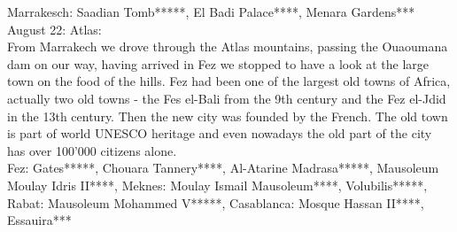 Marrakesch: Saadian Tomb*****, El Badi Palace****, Menara Gardens***\\

August 22: Atlas:\\
From Marrakech we drove through the Atlas mountains, passing the Ouaoumana dam on our way, having arrived in Fez we stopped to have a look at the large town on the food of the hills. Fez had been one of the largest old towns of Africa, actually two old towns - the Fes el-Bali from the 9th century and the Fez el-Jdid in the 13th century. Then the new city was founded by the French. The old town is part of world UNESCO heritage and even nowadays the old part of the city has over 100'000 citizens alone. \\

Fez: Gates*****, Chouara Tannery****, Al-Atarine Madrasa*****, Mausoleum Moulay Idris II****, Meknes: Moulay Ismail Mausoleum****, Volubilis*****, Rabat: Mausoleum Mohammed V*****, Casablanca: Mosque Hassan II****, Essauira***
